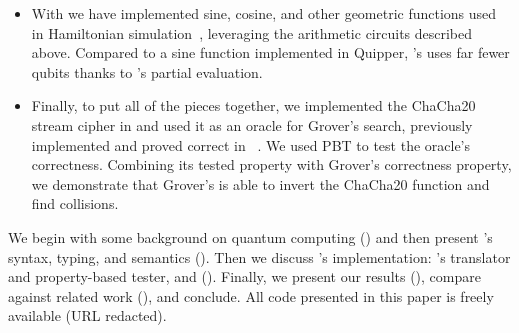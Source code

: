 \begin{itemize}
\item With \vqimp we have implemented sine, cosine, and other geometric functions
used in Hamiltonian
simulation~\cite{feynman1982simulating}, leveraging the arithmetic
circuits described above.
Compared to a sine function implemented in Quipper, \name's uses far 
fewer qubits thanks to \vqimp's partial evaluation.

\item Finally, to put all of the pieces together, we implemented the
  ChaCha20 stream cipher \cite{chacha} in \vqimp and used it as an oracle for
  Grover's search, previously implemented and proved correct in \sqir~\cite{PQPC}. We used PBT to test
  the oracle's correctness. Combining its tested
  property with Grover's correctness property, we demonstrate that Grover's is able to
  invert the ChaCha20 function and find collisions.
\end{itemize}

We begin with some background on quantum computing () and then
present \oqasm's syntax, typing, and semantics (). Then we
discuss \name's implementation: \oqasm's translator and property-based
tester, and \vqimp (). Finally, we present our results
(), compare against related work (), and conclude. All
code presented in this paper is freely available (URL redacted).


